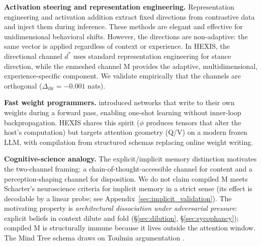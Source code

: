 \textbf{Activation steering and representation engineering.} Representation engineering \citep{zou2023representation} and activation addition \citep{turner2023activation} extract fixed directions from contrastive data and inject them during inference. These methods are elegant and effective for unidimensional behavioral shifts. However, the directions are non-adaptive: the same vector is applied regardless of context or experience. In HEXIS, the directional channel $d^*$ uses standard representation engineering for stance direction, while the enmeshed channel M provides the adaptive, multidimensional, experience-specific component. We validate empirically that the channels are orthogonal ($\Delta_\text{dir} = -0.001$ nats).

\textbf{Fast weight programmers.} \citet{schmidhuber1992learning} introduced networks that write to their own weights during a forward pass, enabling one-shot learning without inner-loop backpropagation. HEXIS shares this spirit ($\phi$ produces tensors that alter the host's computation) but targets attention geometry (Q/V) on a modern frozen LLM, with compilation from structured schemas replacing online weight writing.

\textbf{Cognitive-science analogy.} The explicit/implicit memory distinction \citep{graf1985implicit, schacter1987implicit} motivates the two-channel framing: a chain-of-thought-accessible channel for content and a perception-shaping channel for disposition. We do not claim compiled M meets Schacter's neuroscience criteria for implicit memory in a strict sense (its effect is decodable by a linear probe; see Appendix~\ref{sec:implicit_validation}). The motivating property is \emph{architectural dissociation under adversarial pressure}: explicit beliefs in context dilute and fold (\S\ref{sec:dilution}, \S\ref{sec:sycophancy}); compiled M is structurally immune because it lives outside the attention window. The Mind Tree schema draws on Toulmin argumentation \citep{toulmin1958uses}.
